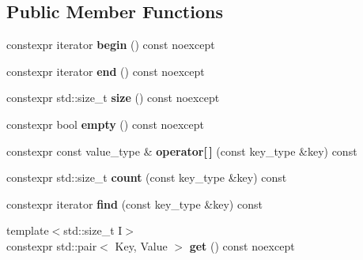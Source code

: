 \subsection*{Public Member Functions}
\begin{DoxyCompactItemize}
\item 
\mbox{\label{classdistant_1_1utility_1_1meta_1_1map_a8c1f0b8add4b58fd71c38e4fa6fca65d}} 
constexpr iterator {\bfseries begin} () const noexcept
\item 
\mbox{\label{classdistant_1_1utility_1_1meta_1_1map_ad481213dd21963bc4ac338a91a59e36c}} 
constexpr iterator {\bfseries end} () const noexcept
\item 
\mbox{\label{classdistant_1_1utility_1_1meta_1_1map_a58696964be8ddd4aa2c3e291b6e485d3}} 
constexpr std\+::size\+\_\+t {\bfseries size} () const noexcept
\item 
\mbox{\label{classdistant_1_1utility_1_1meta_1_1map_a044924de54a7bcd7460474290f0fac97}} 
constexpr bool {\bfseries empty} () const noexcept
\item 
\mbox{\label{classdistant_1_1utility_1_1meta_1_1map_a468f0e39acf991565650c517843dbb03}} 
constexpr const value\+\_\+type \& {\bfseries operator\mbox{[}$\,$\mbox{]}} (const key\+\_\+type \&key) const
\item 
\mbox{\label{classdistant_1_1utility_1_1meta_1_1map_af09b8bd203dde8bc2ca8ff687c0a08f5}} 
constexpr std\+::size\+\_\+t {\bfseries count} (const key\+\_\+type \&key) const
\item 
\mbox{\label{classdistant_1_1utility_1_1meta_1_1map_a00dc857565edb204dc01d8db521ce629}} 
constexpr iterator {\bfseries find} (const key\+\_\+type \&key) const
\item 
\mbox{\label{classdistant_1_1utility_1_1meta_1_1map_a6973a5d6003b29b8c3f1b178afb06de6}} 
{\footnotesize template$<$std\+::size\+\_\+t I$>$ }\\constexpr std\+::pair$<$ Key, Value $>$ {\bfseries get} () const noexcept

\end{DoxyCompactItemize}
